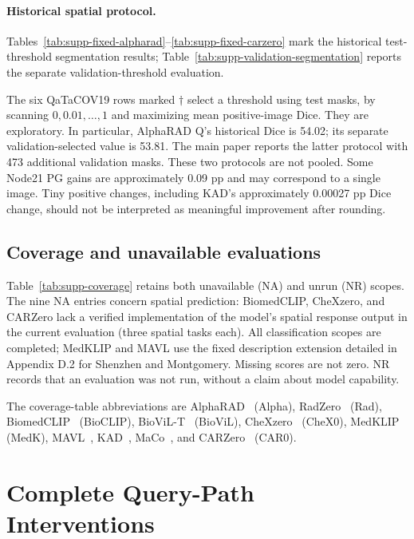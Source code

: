 \paragraph{Historical spatial protocol.}
Tables~\ref{tab:supp-fixed-alpharad}--\ref{tab:supp-fixed-carzero} mark the historical test-threshold segmentation results; Table~\ref{tab:supp-validation-segmentation} reports the separate validation-threshold evaluation.

The six QaTaCOV19 rows marked $\dagger$ select a threshold using test masks, by scanning $0,0.01,\ldots,1$ and maximizing mean positive-image Dice. They are exploratory. In particular, AlphaRAD Q's historical Dice is 54.02; its separate validation-selected value is 53.81. The main paper reports the latter protocol with 473 additional validation masks. These two protocols are not pooled. Some Node21 PG gains are approximately 0.09 pp and may correspond to a single image. Tiny positive changes, including KAD's approximately 0.00027 pp Dice change, should not be interpreted as meaningful improvement after rounding.

\subsection{Coverage and unavailable evaluations}
Table~\ref{tab:supp-coverage} retains both unavailable (NA) and unrun (NR) scopes. The nine NA entries concern spatial prediction: BiomedCLIP, CheXzero, and CARZero lack a verified implementation of the model's spatial response output in the current evaluation (three spatial tasks each). All classification scopes are completed; MedKLIP and MAVL use the fixed description extension detailed in Appendix D.2 for Shenzhen and Montgomery. Missing scores are not zero. NR records that an evaluation was not run, without a claim about model capability.

The coverage-table abbreviations are AlphaRAD~\cite{alpharad} (Alpha), RadZero~\cite{radzero} (Rad), BiomedCLIP~\cite{biomedclip} (BioCLIP), BioViL-T~\cite{biovilt} (BioViL), CheXzero~\cite{chexzero} (CheX0), MedKLIP~\cite{medklip} (MedK), MAVL~\cite{mavl}, KAD~\cite{kad}, MaCo~\cite{maco}, and CARZero~\cite{carzero} (CAR0).


\clearpage

\section{Complete Query-Path Interventions}
\label{supp:paths}
